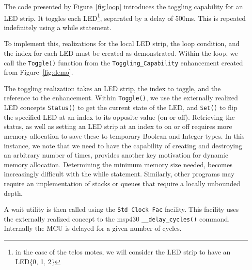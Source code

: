 The code presented by Figure~\ref{fig:loop} introduces the toggling capability for an LED strip. It toggles each LED\footnote{in the case of the telos motes, we will consider the LED strip to have an LED\{0, 1, 2\}}, separated by a delay of 500ms. This is repeated indefinitely using a while statement.

To implement this, realizations for the local LED strip, the loop condition, and the index for each LED must be created as demonstrated. Within the loop, we call the \texttt{Toggle()} function from the \texttt{Toggling\_Capability} enhancement created from Figure~\ref{fig:demo}. 


The toggling realization takes an LED strip, the index to toggle, and the reference to the enhancement. Within \texttt{Toggle()}, we use the externally realized LED concepts \texttt{Status()} to get the current state of the LED, and \texttt{Set()} to flip the specified LED at an index to its opposite value (on or off). Retrieving the status, as well as setting an LED strip at an index to on or off requires more memory allocation to save these to temporary Boolean and Integer types. In this instance, we note that we need to have the capability of creating and destroying an arbitrary number of times, provides another key motivation for dynamic memory allocation. Determining the minimum memory size needed, becomes increasingly difficult with the while statement. Similarly, other programs may require an implementation of stacks or queues that require a locally unbounded depth. 

A wait utility is then called using the \texttt{Std\_Clock\_Fac} facility. This facility uses the externally realized concept to the msp430 \texttt{\_\_delay\_cycles()} command. Internally the MCU is delayed for a given number of cycles. 

%
%
%
%
%
%
%
%
%
%
%
%
%
%